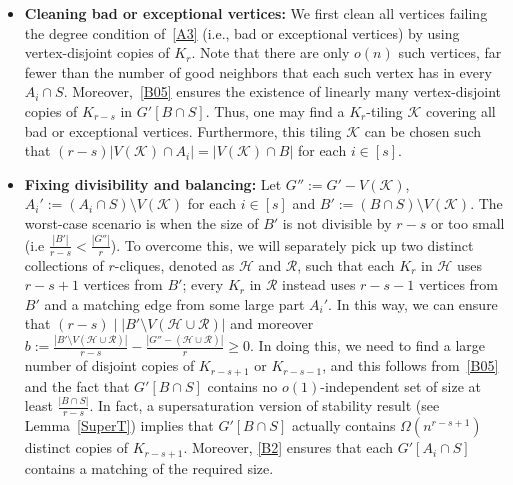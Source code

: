 \documentclass[11pt, a4paper]{article}
\theoremstyle{definition}
\newcommand{\<}{\subseteq}
\begin{document}
\begin{itemize}
    \item {\bf  Cleaning bad or exceptional vertices:} We first clean all vertices failing the degree condition of~\ref{A3} (i.e., bad or exceptional vertices) by using vertex-disjoint copies of $K_r$. %
    Note that there are only $o(n)$ such vertices, far fewer than the number of good neighbors that each such vertex has in every $A_i\cap S$. Moreover,~\ref{B05} ensures the existence of linearly many vertex-disjoint copies of $K_{r-s}$ in $G'[B\cap S]$. %
    Thus, one may find a  $K_r$-tiling $\mathcal{K}$ covering all bad or exceptional vertices.
Furthermore, this tiling $\mathcal{K}$ can be chosen such that $(r-s)|V(\mathcal{K})\cap A_i|=|V(\mathcal{K})\cap B|$ for each $i\in [s]$.

\item {\bf  Fixing divisibility and balancing:} Let $G'':=G'-V(\mathcal{K})$, $A_i':=(A_i\cap S)\setminus V(\mathcal{K})$ for each $i\in [s]$ and $B':=(B\cap S)\setminus V(\mathcal{K})$.
The worst-case scenario is when the size of $B'$ is not divisible by $r-s$ or too small (i.e $\frac{|B'|}{r-s}<\frac{|G''|}{r}$). To overcome this, we will separately pick up two distinct collections of $r$-cliques, denoted as  $\mathcal{H}$ and $\mathcal{R}$, %
such that each $K_r$ in $\mathcal{H}$  uses $r-s+1$ vertices from \(B'\); every \(K_r\) in $\mathcal{R}$ instead uses \(r-s-1\) vertices from \(B'\) and a matching edge from some large part $A_i'$. In this way, we can ensure that $(r-s)\mid |B'\setminus V(\mathcal{H}\cup\mathcal{R})|$ and moreover $b:=\frac{|B'\setminus V(\mathcal{H}\cup\mathcal{R})|}{r-s}- \frac{|G''-(\mathcal{H}\cup\mathcal{R})|}{r}\ge 0$. In doing this, we need to find a large number of disjoint copies of $K_{r-s+1}$ or $K_{r-s-1}$, and this follows from~\ref{B05} and the fact that $G'[B\cap S]$ contains no $o(1)$-independent set of size at least $\frac{|B\cap S|}{r-s}$. In fact, a supersaturation version of stability  result (see Lemma~\ref{SuperT}) implies that $G'[B\cap S]$ actually contains {$\Omega(n^{r-s+1})$ distinct} copies of $K_{r-s+1}$. Moreover, \ref{B2} ensures that each ${G'}[A_i\cap S]$ contains a matching of the required size.



\end{itemize}
\end{document}
